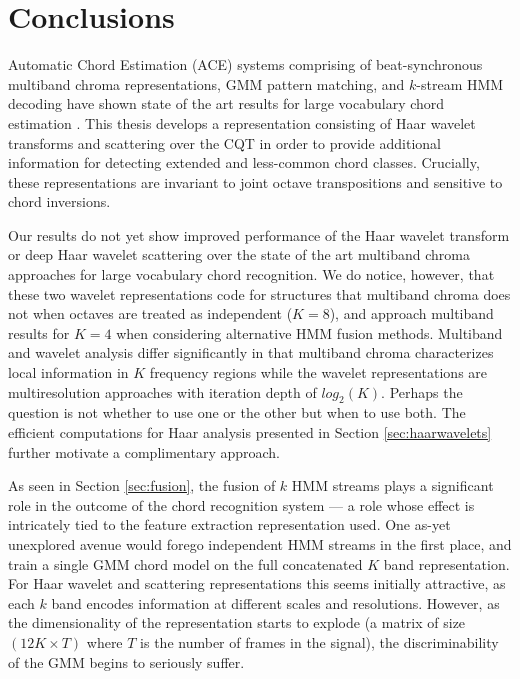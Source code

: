 % 

\section{Conclusions}
\label{conclusions}



Automatic Chord Estimation (ACE) systems comprising of beat-synchronous multiband chroma representations, GMM pattern matching, and $k$-stream HMM decoding have shown state of the art results for large vocabulary chord estimation \cite{cho2013mirex}. This thesis develops a representation consisting of Haar wavelet transforms and scattering over the CQT in order to provide additional information for detecting extended and less-common chord classes. Crucially, these representations are invariant to joint octave transpositions and sensitive to chord inversions. 

Our results do not yet show improved performance of the Haar wavelet transform or deep Haar wavelet scattering over the state of the art multiband chroma approaches for large vocabulary chord recognition. We do notice, however, that these two wavelet representations code for structures that multiband chroma does not when octaves are treated as independent ($K=8$), and approach multiband results for $K=4$ when considering alternative HMM fusion methods. Multiband and wavelet analysis differ significantly in that multiband chroma characterizes local information in $K$ frequency regions while the wavelet representations are multiresolution approaches with iteration depth of $log_2(K)$. Perhaps the question is not whether to use one or the other but when to use both. The efficient computations for Haar analysis presented in Section \ref{sec:haarwavelets} further motivate a complimentary approach.

As seen in Section \ref{sec:fusion}, the fusion of $k$ HMM streams plays a significant role in the outcome of the chord recognition system --- a role whose effect is intricately tied to the feature extraction representation used. One as-yet unexplored avenue would forego independent HMM streams in the first place, and train a single GMM chord model on the full concatenated $K$ band representation. For Haar wavelet and scattering representations this seems initially attractive, as each $k$ band encodes information at different scales and resolutions. However, as the dimensionality of the representation starts to explode (a matrix of size $(12K \times T)$ where $T$ is the number of frames in the signal), the discriminability of the GMM begins to seriously suffer.

